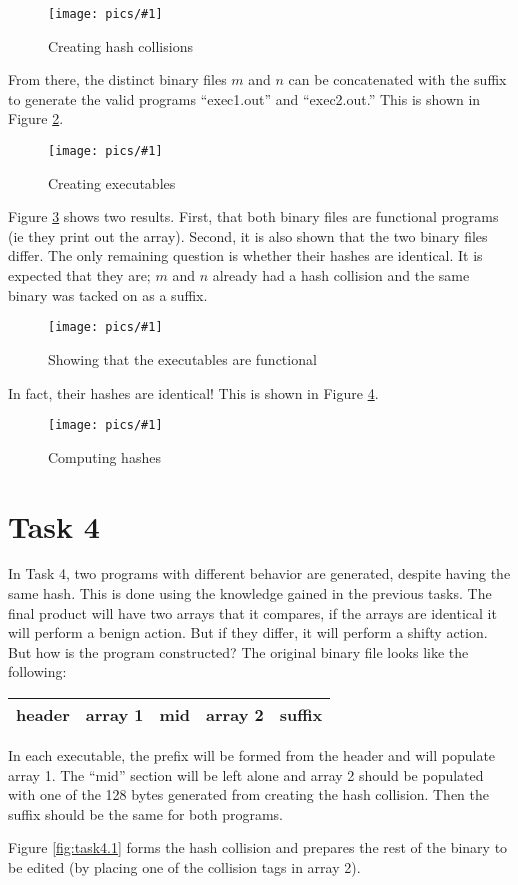 \documentclass[11pt]{article}
\newcommand{\fig}[2]{ 
\begin{figure}[h]
	\centering
	\caption{#2}
	\texttt{[image: pics/\#1]}
	\label{fig:#1}
\end{figure} 
}
\begin{document}
\fig{task3.1}{Creating hash collisions}

From there, the distinct binary files $m$ and $n$ can be concatenated with the suffix to generate the valid programs ``exec1.out'' and ``exec2.out.'' This is shown in Figure \ref{fig:task3.2}.

\fig{task3.2}{Creating executables}

Figure \ref{fig:task3.3} shows two results. First, that both binary files are functional programs (ie they print out the array). Second, it is also shown that the two binary files differ. The only remaining question is whether their hashes are identical. It is expected that they are; $m$ and $n$ already had a hash collision and the same binary was tacked on as a suffix.

\newpage

\fig{task3.3}{Showing that the executables are functional}

In fact, their hashes are identical! This is shown in Figure \ref{fig:task3.4}.

\fig{task3.4}{Computing hashes}

\newpage
\section*{Task 4}

In Task 4, two programs with different behavior are generated, despite having the same hash. This is done using the knowledge gained in the previous tasks. The final product will have two arrays that it compares, if the arrays are identical it will perform a benign action. But if they differ, it will perform a shifty action. But how is the program constructed? The original binary file looks like the following:
\begin{center}
	\begin{tabular}{|c|c|c|c|c|}
		\hline
		header & array 1 & mid & array 2 & suffix \\
		\hline
	\end{tabular}
\end{center}

In each executable, the prefix will be formed from the header and will populate array 1. The ``mid'' section will be left alone and array 2 should be populated with one of the 128 bytes generated from creating the hash collision. Then the suffix should be the same for both programs.

Figure \ref{fig:task4.1} forms the hash collision and prepares the rest of the binary to be edited (by placing one of the collision tags in array 2).
\end{document}
